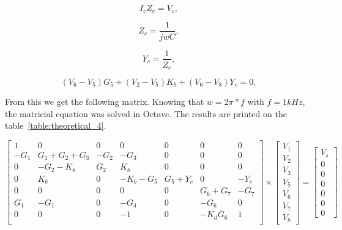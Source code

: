 \begin{equation}
  I_{c}Z_{c} = V_{c},
  \label{eq:caphasor1}
\end{equation}

\begin{equation}
  Z_{c} = \frac{1}{jwC},
  \label{eq:impedancecap}
\end{equation}

\begin{equation}
 Y_{c} = \frac{1}{Z_c},
  \label{eq:caphasor2}
\end{equation}

\begin{equation}
   (V_{6} - V_{5})G_{5} + (V_{2} - V_{5})K_{b} + (V_{6} - V_{8})Y_{c} = 0,
  \label{eq:node67}
\end{equation}

From this we get the following matrix. Knowing that $w = 2\pi*f$ with $f = 1kHz$, the matricial equation was solved in Octave. The results are printed on the table~\ref{table:theoretical_4}.

\begin{equation}
\left[ \begin{array}{ccccccc} 
		1 & 0 & 0 & 0 & 0 & 0 & 0 \\ 
		-G_1 & G_1+G_2+G_3 & -G_2 & -G_3 & 0 & 0 & 0 \\
		0 & -G_2-K_b & G_2 & K_b & 0 & 0 & 0 \\ 
		0 & K_b & 0 & -K_b-G_5 & G_5+Y_c & 0 & -Y_c  \\ 
		0 & 0 & 0 & 0 & 0 & G_6+G_7 & -G_7  \\ 
		G_1 & -G_1 & 0 & -G_4 & 0 & -G_6 & 0  \\ 
		0 & 0 & 0 & -1 & 0 & -K_dG_6 & 1 \\ 

\end{array} \right]
\times \left[ \begin{array}{c} V_1 \\ V_2 \\ V_3 \\  V_5 \\ V_6 \\ V_7 \\ V_8 \end{array} \right] =
\left[ \begin{array}{c} V_s \\ 0 \\ 0 \\ 0 \\ 0 \\ 0 \\ 0  \end{array} \right]
\label{eq:nodalmatrix4}
\end{equation}

